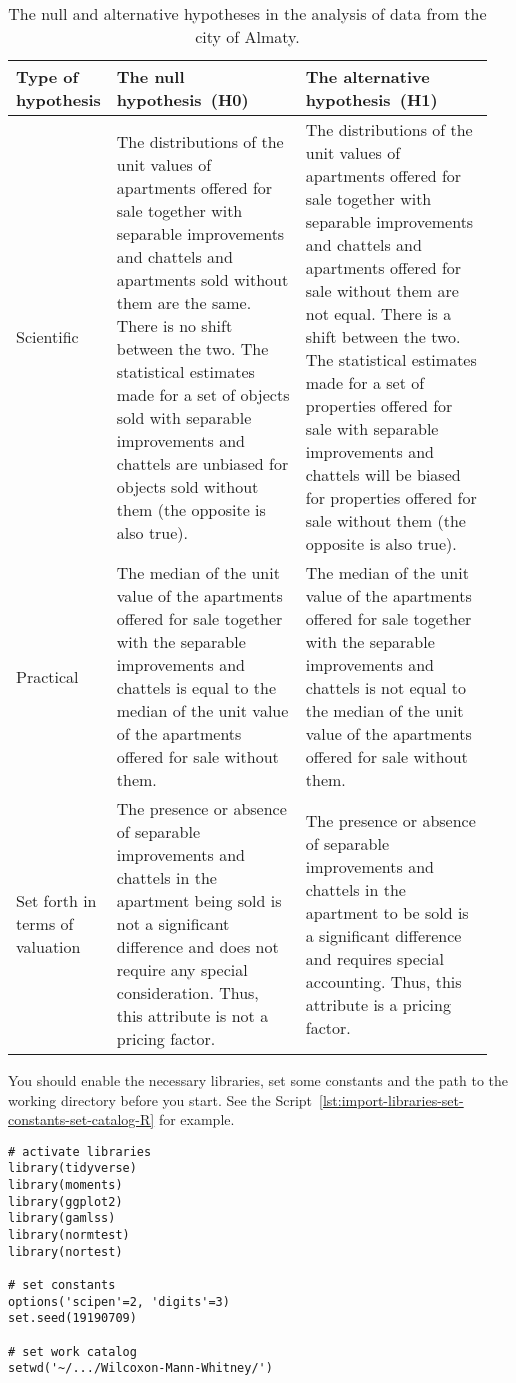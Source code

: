 \documentclass[]{scrreprt}
\begin{document}
\begin{table}[htp]
	\caption{The null and alternative hypotheses in the analysis of data from the city of Almaty.} \label{tab:nul-alt-hypothesis-almaty}
	\centering
	\begin{tabularx}{\textwidth}{p{0.15\linewidth} p{0.4\linewidth} p{0.4\linewidth}} 
		\hline
		Type of hypothesis&The null hypothesis~(H0)&The alternative hypothesis~(H1)\\
		\hline
		Scientific&The distributions of the unit values of apartments offered for sale together with separable improvements and chattels and apartments sold without them are the same. There is no shift between the two. The statistical estimates made for a set of objects sold with separable improvements and chattels are unbiased for objects sold without them (the opposite is also true).&The distributions of the unit values of apartments offered for sale together with separable improvements and chattels and apartments offered for sale without them are not equal. There is a shift between the two. The statistical estimates made for a set of properties offered for sale with separable improvements and chattels will be biased for properties offered for sale without them (the opposite is also true).\\
		\hline
		Practical&The median of the unit value of the apartments offered for sale together with the separable improvements and chattels is equal to the median of the unit value of the apartments offered for sale without them.&The median of the unit value of the apartments offered for sale together with the separable improvements and chattels is not equal to the median of the unit value of the apartments offered for sale without them.\\
		\hline
		Set forth in terms of valuation&The presence or absence of separable improvements and chattels in the apartment being sold is not a significant difference and does not require any special consideration. Thus, this attribute is not a pricing factor.&The presence or absence of separable improvements and chattels in the apartment to be sold is a significant difference and requires special accounting. Thus, this attribute is a pricing factor.\\
		\hline
	\end{tabularx}
\end{table}
%

You should enable the necessary libraries, set some constants and the path to the working directory before you start. See the Script~\ref{lst:import-libraries-set-constants-set-catalog-R} for example.
%
\begin{lstlisting}[float=htp, caption = Enables libraries and specifies the values of constants and the path to the working directory, firstnumber=1, label= lst:import-libraries-set-constants-set-catalog-R]
# activate libraries
library(tidyverse)
library(moments)
library(ggplot2)
library(gamlss)
library(normtest)
library(nortest)

# set constants
options('scipen'=2, 'digits'=3)
set.seed(19190709)

# set work catalog
setwd('~/.../Wilcoxon-Mann-Whitney/')
\end{lstlisting}  
%
\end{document}
